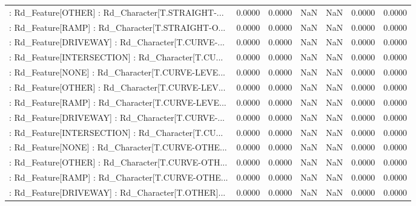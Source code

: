 \begin{longtable}{p{4cm}cccccc}
 : Rd\_Feature[OTHER] : Rd\_Character[T.STRAIGHT-... &            0.0000 &            0.0000 &     NaN &          NaN &             0.0000 &            0.0000 \\
 : Rd\_Feature[RAMP] : Rd\_Character[T.STRAIGHT-O... &            0.0000 &            0.0000 &     NaN &          NaN &             0.0000 &            0.0000 \\
 : Rd\_Feature[DRIVEWAY] : Rd\_Character[T.CURVE-... &            0.0000 &            0.0000 &     NaN &          NaN &             0.0000 &            0.0000 \\
 : Rd\_Feature[INTERSECTION] : Rd\_Character[T.CU... &            0.0000 &            0.0000 &     NaN &          NaN &             0.0000 &            0.0000 \\
 : Rd\_Feature[NONE] : Rd\_Character[T.CURVE-LEVE... &            0.0000 &            0.0000 &     NaN &          NaN &             0.0000 &            0.0000 \\
 : Rd\_Feature[OTHER] : Rd\_Character[T.CURVE-LEV... &            0.0000 &            0.0000 &     NaN &          NaN &             0.0000 &            0.0000 \\
 : Rd\_Feature[RAMP] : Rd\_Character[T.CURVE-LEVE... &            0.0000 &            0.0000 &     NaN &          NaN &             0.0000 &            0.0000 \\
 : Rd\_Feature[DRIVEWAY] : Rd\_Character[T.CURVE-... &            0.0000 &            0.0000 &     NaN &          NaN &             0.0000 &            0.0000 \\
 : Rd\_Feature[INTERSECTION] : Rd\_Character[T.CU... &            0.0000 &            0.0000 &     NaN &          NaN &             0.0000 &            0.0000 \\
 : Rd\_Feature[NONE] : Rd\_Character[T.CURVE-OTHE... &            0.0000 &            0.0000 &     NaN &          NaN &             0.0000 &            0.0000 \\
 : Rd\_Feature[OTHER] : Rd\_Character[T.CURVE-OTH... &            0.0000 &            0.0000 &     NaN &          NaN &             0.0000 &            0.0000 \\
 : Rd\_Feature[RAMP] : Rd\_Character[T.CURVE-OTHE... &            0.0000 &            0.0000 &     NaN &          NaN &             0.0000 &            0.0000 \\
 : Rd\_Feature[DRIVEWAY] : Rd\_Character[T.OTHER]... &            0.0000 &            0.0000 &     NaN &          NaN &             0.0000 &            0.0000 \\

\end{longtable}
